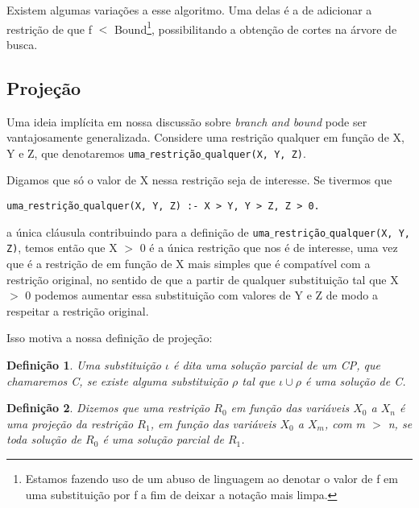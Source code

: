 \documentclass{article}
\newtheorem{definition}{Definição}[section]
\theoremstyle{remark}
\theoremstyle{theorem}
\begin{document}
Existem algumas variações a esse algoritmo. Uma delas é a de adicionar a restrição de que f $<$ Bound\footnote{Estamos fazendo uso de um abuso de linguagem ao denotar o valor de f em uma substituição por f a fim de deixar a notação mais limpa.}, possibilitando a obtenção de cortes na árvore de busca.

\subsection{Projeção}

Uma ideia implícita em nossa discussão sobre \textit{branch and bound} pode ser vantajosamente generalizada. Considere uma restrição qualquer em função de X, Y e Z, que denotaremos {\tt uma$\_$restrição$\_$qualquer(X, Y, Z)}.

Digamos que só o valor de X nessa restrição seja de interesse. Se tivermos que

{\tt uma$\_$restrição$\_$qualquer(X, Y, Z) :- X > Y, Y > Z, Z > 0.}

 a única cláusula contribuindo para a definição de {\tt uma$\_$restrição$\_$qualquer(X, Y, Z)}, temos então que X $>$ 0
é a única restrição que nos é de interesse, uma vez que é a restrição de em função de X mais simples que é compatível com a restrição original, no sentido de que a partir de qualquer substituição tal que X $>$ 0 podemos aumentar essa substituição com valores de Y e Z de modo a respeitar a restrição original.


Isso motiva a nossa definição de projeção:

\begin{definition}
  Uma substituição $\iota$ é dita uma solução parcial de um CP, que chamaremos C, se existe alguma substituição $\rho$ tal que $\iota \cup \rho$ é uma solução de C.
\end{definition}

\begin{definition}
  Dizemos que uma restrição $R_0$ em função das variáveis $X_0$ a $X_n$ é uma projeção da restrição $R_1$, em função das variáveis $X_0$ a $X_m$, com m $>$ n, se toda solução de $R_0$ é uma solução parcial de $R_1$.
\end{definition}
\end{document}
